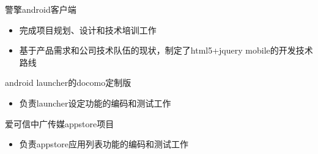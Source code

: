   \item 警擎android客户端
  \begin{itemize}
    \item 完成项目规划、设计和技术培训工作
    \item 基于产品需求和公司技术队伍的现状，制定了html5+jquery mobile的开发技术路线
  \end{itemize}
  \item android launcher的docomo定制版
  \begin{itemize}
    \item 负责launcher设定功能的编码和测试工作
  \end{itemize}
  \item 爱可信中广传媒appstore项目
  \begin{itemize}
    \item 负责appstore应用列表功能的编码和测试工作
  \end{itemize}
